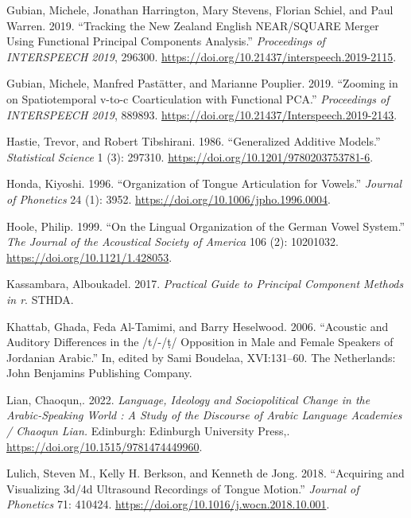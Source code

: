 \documentclass[
]{interact}
\newlength{\cslhangindent}
\newenvironment{CSLReferences}[2] %
 {\begin{list}{}{%
  \setlength{\itemindent}{0pt}
  \setlength{\leftmargin}{0pt}
  \setlength{\parsep}{0pt}
  \ifodd #1
   \setlength{\leftmargin}{\cslhangindent}
   \setlength{\itemindent}{-1\cslhangindent}
  \fi
  \setlength{\itemsep}{#2\baselineskip}}}
 {\end{list}}
\begin{document}
\begin{CSLReferences}{1}{0}
Gubian, Michele, Jonathan Harrington, Mary Stevens, Florian Schiel, and
Paul Warren. 2019. {``Tracking the New Zealand English NEAR/SQUARE
Merger Using Functional Principal Components Analysis.''}
\emph{Proceedings of INTERSPEECH 2019}, 296300.
\url{https://doi.org/10.21437/interspeech.2019-2115}.

Gubian, Michele, Manfred Pastätter, and Marianne Pouplier. 2019.
{``Zooming in on Spatiotemporal v-to-c Coarticulation with Functional
PCA.''} \emph{Proceedings of INTERSPEECH 2019}, 889893.
\url{https://doi.org/10.21437/Interspeech.2019-2143}.

Hastie, Trevor, and Robert Tibshirani. 1986. {``Generalized Additive
Models.''} \emph{Statistical Science} 1 (3): 297310.
\url{https://doi.org/10.1201/9780203753781-6}.

Honda, Kiyoshi. 1996. {``Organization of Tongue Articulation for
Vowels.''} \emph{Journal of Phonetics} 24 (1): 3952.
\url{https://doi.org/10.1006/jpho.1996.0004}.

Hoole, Philip. 1999. {``On the Lingual Organization of the German Vowel
System.''} \emph{The Journal of the Acoustical Society of America} 106
(2): 10201032. \url{https://doi.org/10.1121/1.428053}.

Kassambara, Alboukadel. 2017. \emph{Practical Guide to Principal
Component Methods in r}. STHDA.

Khattab, Ghada, Feda Al-Tamimi, and Barry Heselwood. 2006. {``Acoustic
and Auditory Differences in the /t/-/ṭ/ Opposition in Male and Female
Speakers of Jordanian Arabic.''} In, edited by Sami Boudelaa,
XVI:131--60. The Netherlands: John Benjamins Publishing Company.

Lian, Chaoqun,. 2022. \emph{Language, Ideology and Sociopolitical Change
in the Arabic-Speaking World : A Study of the Discourse of Arabic
Language Academies / Chaoqun Lian.} Edinburgh: Edinburgh University
Press,. \url{https://doi.org/10.1515/9781474449960}.

Lulich, Steven M., Kelly H. Berkson, and Kenneth de Jong. 2018.
{``Acquiring and Visualizing 3d/4d Ultrasound Recordings of Tongue
Motion.''} \emph{Journal of Phonetics} 71: 410424.
\url{https://doi.org/10.1016/j.wocn.2018.10.001}.


\end{CSLReferences}
\end{document}
